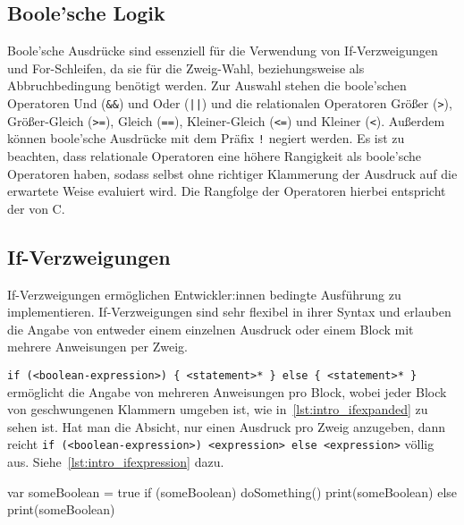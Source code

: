 
\subsection{Boole'sche Logik}

Boole'sche Ausdrücke sind essenziell für die Verwendung von If-Verzweigungen und For-Schleifen, da sie für die Zweig-Wahl, beziehungsweise als Abbruchbedingung benötigt werden. Zur Auswahl stehen die boole'schen Operatoren Und (\texttt{\&\&}) und Oder (\texttt{||}) und die relationalen Operatoren Größer (\texttt{>}), Größer-Gleich (\texttt{>=}), Gleich (\texttt{==}), Kleiner-Gleich (\texttt{<=}) und Kleiner (\texttt{<}). Außerdem können boole'sche Ausdrücke mit dem Präfix \texttt{!} negiert werden. Es ist zu beachten, dass relationale Operatoren eine höhere Rangigkeit als boole'sche Operatoren haben, sodass selbst ohne richtiger Klammerung der Ausdruck auf die erwartete Weise evaluiert wird. Die Rangfolge der Operatoren hierbei entspricht der von C.


\subsection{If-Verzweigungen}

If-Verzweigungen ermöglichen Entwickler:innen bedingte Ausführung zu implementieren. If-Verzweigungen sind sehr flexibel in ihrer Syntax und erlauben die Angabe von entweder einem einzelnen Ausdruck oder einem Block mit mehrere Anweisungen per Zweig.

\texttt{if (<boolean-expression>) \{ <statement>* \} else \{ <statement>* \}} ermöglicht die Angabe von mehreren Anweisungen pro Block, wobei jeder Block von geschwungenen Klammern umgeben ist, wie in~\autoref{lst:intro_ifexpanded} zu sehen ist. Hat man die Absicht, nur einen Ausdruck pro Zweig anzugeben, dann reicht \texttt{if (<boolean-expression>) <expression> else <expression>} völlig aus. Siehe~\autoref{lst:intro_ifexpression} dazu.

\begin{ToyaCode}[numbers=none, caption={If-Verzweigung als klassische Anweisung.}, label=lst:intro_ifexpanded]
var someBoolean = true
if (someBoolean) {
    doSomething()
    print(someBoolean)
} else {
    print(someBoolean)
}
\end{ToyaCode}

